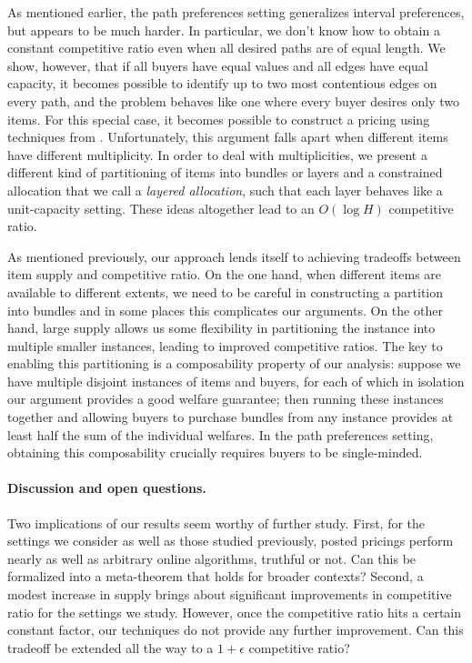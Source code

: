 As mentioned earlier, the path preferences setting generalizes
interval preferences, but appears to be much harder. In particular, we
don't know how to obtain a constant competitive ratio even when all
desired paths are of equal length. We show, however, that if all
buyers have equal values and all edges have equal capacity, it becomes
possible to identify up to two most contentious edges on every path,
and the problem behaves like one where every buyer desires only two
items. For this special case, it becomes possible to construct a
pricing using techniques from \cite{FGL15}. Unfortunately, this
argument falls apart when different items have different multiplicity.
In order to deal with multiplicities, we present a different kind of
partitioning of items into bundles or layers and a constrained
allocation that we call a {\em layered allocation}, such that each
layer behaves like a unit-capacity setting. These ideas altogether
lead to an $O(\log H)$ competitive ratio.

As mentioned previously, our approach lends itself to achieving
tradeoffs between item supply and competitive ratio. On the one hand,
when different items are available to different extents, we need to be
careful in constructing a partition into bundles and in some places
this complicates our arguments. On the other hand, large supply allows
us some flexibility in partitioning the instance into multiple smaller
instances, leading to improved competitive ratios. The key to enabling
this partitioning is a composability property of our analysis: suppose
we have multiple disjoint instances of items and buyers, for each of
which in isolation our argument provides a good welfare guarantee;
then running these instances together and allowing buyers
to purchase bundles from any instance provides at least half the sum
of the individual welfares. In the path preferences setting, obtaining
this composability crucially requires buyers to be single-minded.

\paragraph{Discussion and open questions.} Two implications of our
results seem worthy of further study. First, for the settings we
consider as well as those studied previously, posted pricings perform
nearly as well as arbitrary online algorithms, truthful or not. Can
this be formalized into a meta-theorem that holds for broader
contexts? Second, a modest increase in supply brings about significant
improvements in competitive ratio for the settings we study. However,
once the competitive ratio hits a certain constant factor, our
techniques do not provide any further improvement. Can this tradeoff
be extended all the way to a $1+\epsilon$ competitive ratio?

